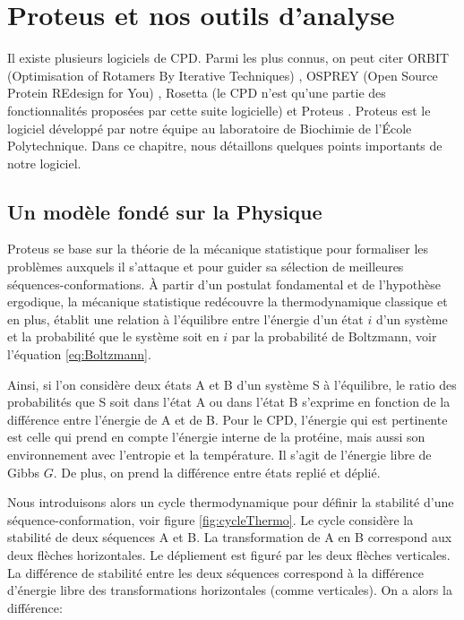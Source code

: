 \chapter{Proteus et nos outils d'analyse}
\label{chap:methodes}

Il existe plusieurs logiciels de CPD. Parmi les plus connus, on peut citer ORBIT (Optimisation of Rotamers By Iterative Techniques) \cite{Dahiyat96}, OSPREY (Open Source Protein REdesign for You) \cite{Gainza13}, Rosetta (le CPD n'est qu'une partie des fonctionnalités proposées par cette suite logicielle) \cite{Kuhlman03} et Proteus \cite{Simonson13,Polydorides16}. Proteus est le logiciel développé par notre équipe au laboratoire de Biochimie de l'École Polytechnique. Dans ce chapitre, nous détaillons quelques points importants de notre logiciel.  

\section{Un modèle fondé sur la Physique}
\label{sec:Phy}
Proteus se base sur la théorie de la mécanique statistique pour formaliser les problèmes auxquels il s'attaque et pour guider sa sélection de meilleures séquences-conformations. À partir d'un postulat fondamental et de l'hypothèse ergodique, la mécanique statistique \og redécouvre \fg la thermodynamique classique et en plus, établit une relation à l'équilibre entre l'énergie d'un état $i$ d'un système et la probabilité que le système soit en $i$ par la probabilité de Boltzmann, voir l'équation \vref{eq:Boltzmann}.

Ainsi, si l'on considère deux états A et B d'un système S à l'équilibre, le ratio des probabilités que S soit dans l'état A ou dans l'état B s'exprime en fonction de la différence entre l'énergie de A et de B. Pour le CPD, l'énergie qui est pertinente est celle qui prend en compte l'énergie interne de la protéine, mais aussi son environnement avec l'entropie et la température. Il s'agit de l'énergie libre de Gibbs $G$. De plus, on prend la différence entre états replié et déplié.

Nous introduisons alors un cycle thermodynamique pour définir la stabilité d'une séquence-conformation, voir figure \ref{fig:cycleThermo}. Le cycle considère la stabilité de deux séquences A et B. La transformation de A en B correspond aux deux flèches horizontales. Le dépliement est figuré par les deux flèches verticales. La différence de stabilité entre les deux séquences correspond à la différence d'énergie libre des transformations horizontales (comme verticales). On a alors la différence: 

